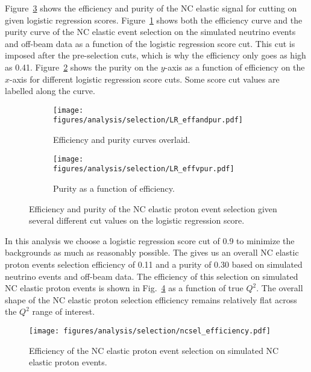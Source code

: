     Figure~\ref{fig:lreffpur} shows the efficiency and purity of the NC elastic
    signal for cutting on given logistic regression scores.
    Figure~\ref{fig:lreffnpur} shows both the efficiency curve and the purity
    curve of the NC elastic event selection on the simulated neutrino events
    and off-beam data as a function of the logistic regression score cut. This
    cut is imposed after the pre-selection cuts, which is why the efficiency
    only goes as high as 0.41. Figure~\ref{fig:lreffvpur} shows the purity on
    the $y$-axis as a function of efficiency on the $x$-axis for different
    logistic regression score cuts. Some score cut values are labelled along
    the curve.
    \begin{figure}[h]
      \centering
      \begin{subfigure}[t]{2.5in}
        \texttt{[image: figures/analysis/selection/LR\_effandpur.pdf]}\hspace{2pc}%
        \caption{Efficiency and purity curves overlaid.}
        \label{fig:lreffnpur}
      \end{subfigure}
      \hspace{2pt}
      \begin{subfigure}[t]{2.5in}
        \texttt{[image: figures/analysis/selection/LR\_effvpur.pdf]}\hspace{2pc}%
        \caption{Purity as a function of efficiency.}
        \label{fig:lreffvpur}
      \end{subfigure}
      \caption{Efficiency and purity of the NC elastic proton event selection
      given several different cut values on the logistic regression score.
      \label{fig:lreffpur}}
    \end{figure}
   
    In this analysis we choose a logistic regression score cut of 0.9 to
    minimize the backgrounds as much as reasonably possible. The gives us an
    overall NC elastic proton events selection efficiency of 0.11 and a purity
    of 0.30 based on simulated neutrino events and off-beam data. The
    efficiency of this selection on simulated NC elastic proton events is shown
    in Fig.~\ref{fig:nceeff} as a function of true $Q^2$. The overall shape of
    the NC elastic proton selection efficiency remains relatively flat across
    the $Q^2$ range of interest.
    \begin{figure}[ht]
      \centering
      \texttt{[image: figures/analysis/selection/ncsel\_efficiency.pdf]}
      \caption{Efficiency of the NC elastic proton event selection on simulated
      NC elastic proton events.}
      \label{fig:nceeff}
    \end{figure}

